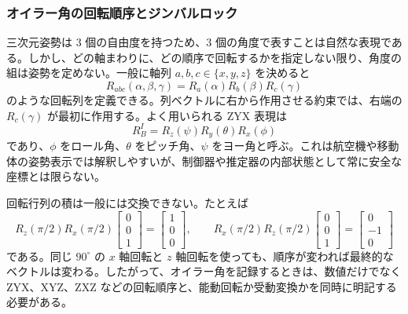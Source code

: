 \subsubsection{オイラー角の回転順序とジンバルロック}

三次元姿勢は 3 個の自由度を持つため、3 個の角度で表すことは自然な表現である。しかし、どの軸まわりに、どの順序で回転するかを指定しない限り、角度の組は姿勢を定めない。一般に軸列 $a,b,c\in\{x,y,z\}$ を決めると
\begin{equation}
  R_{abc}(\alpha,\beta,\gamma)
  =R_a(\alpha)R_b(\beta)R_c(\gamma)
\end{equation}
のような回転列を定義できる。列ベクトルに右から作用させる約束では、右端の $R_c(\gamma)$ が最初に作用する。よく用いられる ZYX 表現は
\begin{equation}
  R^I_B=R_z(\psi)R_y(\theta)R_x(\phi)
\end{equation}
であり、$\phi$ をロール角、$\theta$ をピッチ角、$\psi$ をヨー角と呼ぶ。これは航空機や移動体の姿勢表示では解釈しやすいが、制御器や推定器の内部状態として常に安全な座標とは限らない。

回転行列の積は一般には交換できない。たとえば
\begin{equation}
  R_z(\pi/2)R_x(\pi/2)
  \begin{bmatrix}0\\0\\1\end{bmatrix}
  =
  \begin{bmatrix}1\\0\\0\end{bmatrix},
  \qquad
  R_x(\pi/2)R_z(\pi/2)
  \begin{bmatrix}0\\0\\1\end{bmatrix}
  =
  \begin{bmatrix}0\\-1\\0\end{bmatrix}
\end{equation}
である。同じ $90^\circ$ の $x$ 軸回転と $z$ 軸回転を使っても、順序が変われば最終的なベクトルは変わる。したがって、オイラー角を記録するときは、数値だけでなく ZYX、XYZ、ZXZ などの回転順序と、能動回転か受動変換かを同時に明記する必要がある。

